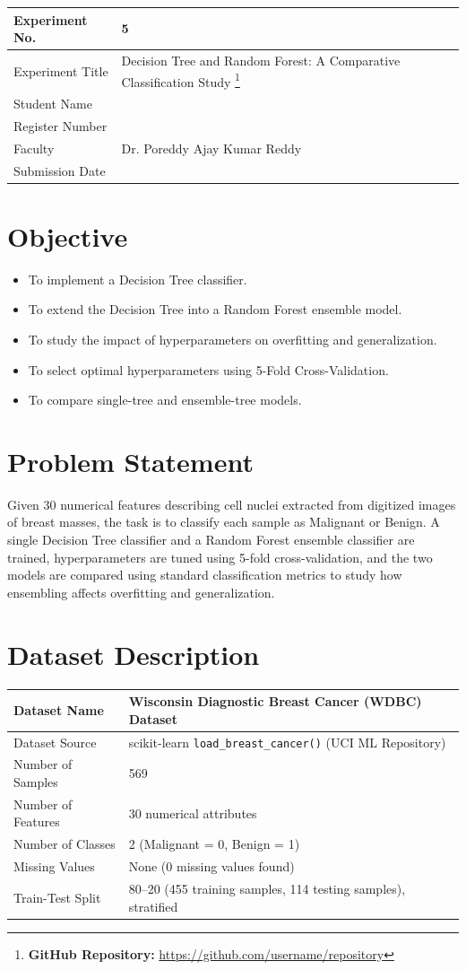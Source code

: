 \documentclass[12pt,a4paper]{article}
\begin{document}
\begin{tabular}{|p{4cm}|p{11cm}|}
\hline
Experiment No. & 5 \\ \hline
Experiment Title & Decision Tree and Random Forest: A Comparative Classification Study
\footnote{\textbf{GitHub Repository: }\url{https://github.com/username/repository}}\\ \hline
Student Name & \\ \hline
Register Number & \\ \hline
Faculty & Dr. Poreddy Ajay Kumar Reddy \\ \hline
Submission Date & \\ \hline
\end{tabular}

\section{Objective}
\begin{itemize}
\item To implement a Decision Tree classifier.
\item To extend the Decision Tree into a Random Forest ensemble model.
\item To study the impact of hyperparameters on overfitting and generalization.
\item To select optimal hyperparameters using 5-Fold Cross-Validation.
\item To compare single-tree and ensemble-tree models.
\end{itemize}

\section{Problem Statement}
Given 30 numerical features describing cell nuclei extracted from digitized images of breast
masses, the task is to classify each sample as Malignant or Benign. A single Decision Tree
classifier and a Random Forest ensemble classifier are trained, hyperparameters are tuned using
5-fold cross-validation, and the two models are compared using standard classification metrics
to study how ensembling affects overfitting and generalization.

\section{Dataset Description}
\begin{longtable}{|p{6cm}|p{8cm}|}
\hline
Dataset Name & Wisconsin Diagnostic Breast Cancer (WDBC) Dataset \\ \hline
Dataset Source & scikit-learn \texttt{load\_breast\_cancer()} (UCI ML Repository) \\ \hline
Number of Samples & 569 \\ \hline
Number of Features & 30 numerical attributes \\ \hline
Number of Classes & 2 (Malignant = 0, Benign = 1) \\ \hline
Missing Values & None (0 missing values found) \\ \hline
Train-Test Split & 80--20 (455 training samples, 114 testing samples), stratified \\ \hline
\end{longtable}
\end{document}
